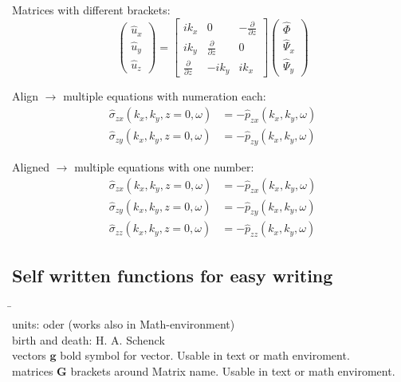 Matrices with different brackets:
\begin{equation}
\begin{pmatrix}
\hat u_x \\
\hat u_y\\
\hat u_z
\end{pmatrix}
%
=
% 
\begin{bmatrix}
i k_x & 0 & - \frac{\partial}{\partial z} \\
i k_y & \frac{\partial}{\partial z} & 0\\
\frac{\partial}{\partial z} & -i k_y & i k_x
\end{bmatrix}
%
\begin{pmatrix}
\hat \Phi\\
\hat \Psi_x\\
\hat \Psi_y
\end{pmatrix}
%
\label{eq_027} 
\end{equation}

Align $\rightarrow$ multiple equations with numeration each:
\begin{align}
	\hat{\sigma}_{zx}(k_x,k_y,z=0,\omega) &=-\hat{p}_{zx}(k_x,k_y,\omega) \\[10pt]
		 \hat{\sigma}_{zy}(k_x,k_y,z=0,\omega) &=-\hat{p}_{zy}(k_x,k_y,\omega)
\end{align}

Aligned $\rightarrow$ multiple equations with one number:
\begin{equation}\label{eq:RB_OF}
	\begin{aligned}
		 \hat{\sigma}_{zx}(k_x,k_y,z=0,\omega) &=-\hat{p}_{zx}(k_x,k_y,\omega) \\[10pt]
		 \hat{\sigma}_{zy}(k_x,k_y,z=0,\omega) &=-\hat{p}_{zy}(k_x,k_y,\omega) \\[10pt]
		 \hat{\sigma}_{zz}(k_x,k_y,z=0,\omega) &=-\hat{p}_{zz}(k_x,k_y,\omega) 
		\end{aligned}
\end{equation}




\subsection{Self written functions for easy writing}
\label{sec:helpers}

\begin{tabbing}
\hspace*{4cm}\=\hspace*{3cm}\= \\
	 units: \>  oder  (works also in Math-environment)\\
	 birth and death: \> H. A. Schenck \\
	 vectors \> $\mathbf{g}$ bold symbol for vector. Usable in text or math enviroment.\\
	 matrices \> $\mathbf{G}$ brackets around Matrix name. Usable in text or math enviroment.\\
\end{tabbing}

